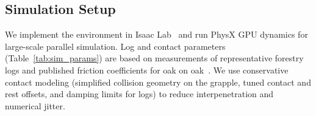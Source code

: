 \documentclass[letterpaper, 10 pt, conference]{ieeeconf}
\begin{document}
\subsection{Simulation Setup}
We implement the environment in Isaac Lab~\cite{mittal2025isaaclab} and run PhysX GPU dynamics for large-scale parallel simulation.
Log and contact parameters (Table~\ref{tab:sim_params}) are based on measurements of representative forestry logs and published friction coefficients for oak on oak~\cite{avallone2006marks}.
We use conservative contact modeling (simplified collision geometry on the grapple, tuned contact and rest offsets, and damping limits for logs) to reduce interpenetration and numerical jitter.

\begin{table}[t]
\centering
\caption{Simulation and controller parameters. Actuator gains are implicit PhysX joint-drive values; IK gains are the PD velocity controller used by the FSM.}
\label{tab:sim_params}
\scriptsize
{}
\end{table}
\end{document}
